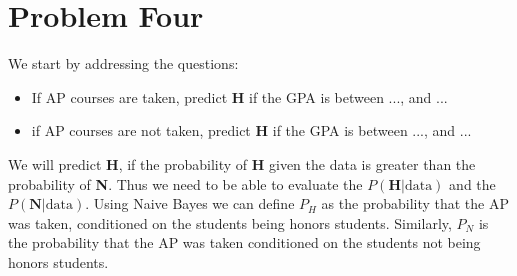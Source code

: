\documentclass{article}
\begin{document}
\section{Problem Four}

We start by addressing the questions: 
\begin{itemize}
\item If AP courses are taken, predict \textbf{H} if the GPA is between ..., and ...
\item if AP courses are not taken, predict \textbf{H} if the GPA is between ..., and ...
\end{itemize}

We will predict \textbf{H}, if the probability of \textbf{H} given the data is greater than the probability of \textbf{N}. Thus we need to be able to evaluate the $P(\mathbf{H}|\text{data})$ and the $P(\mathbf{N}|\text{data})$. Using Naive Bayes we can define $P_H$ as the probability that the AP was taken, conditioned on the students being honors students. Similarly, $P_N$ is the probability that the AP was taken conditioned on the students not being honors students. 
\end{document}
